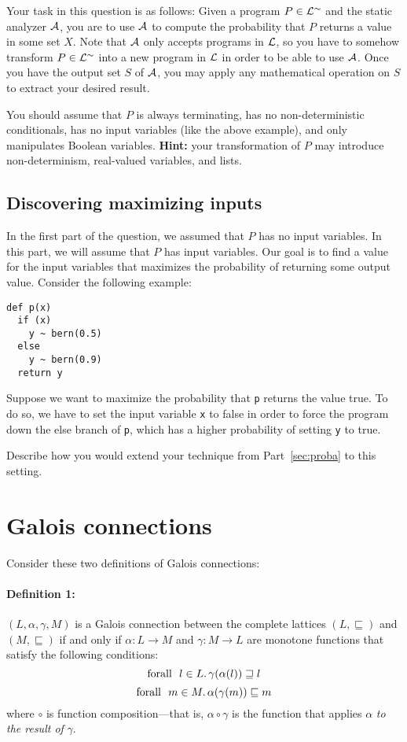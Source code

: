 \documentclass[11pt, oneside]{article}   	%
\begin{document}
Your task in this question is as follows:
Given a program $P \in \mathcal{L}^\sim$ and the static
analyzer $\mathcal{A}$, you are to use $\mathcal{A}$
to compute the probability that $P$ returns
a value in some set $X$.
Note that $\mathcal{A}$ only accepts programs in $\mathcal{L}$,
so you have to somehow transform $P \in \mathcal{L}^\sim$ into a new
program in $\mathcal{L}$
in order to be able to use $\mathcal{A}$.
Once you have the output set $S$ of $\mathcal{A}$,
you may apply any mathematical  operation on $S$ to
extract your desired result.

You should assume that $P$ is always terminating,
has no non-deterministic conditionals,
has no input variables (like the above example),
and only manipulates Boolean variables.
\textbf{Hint:} your transformation of $P$
may introduce non-determinism, real-valued variables,
and lists.

\subsection{Discovering maximizing inputs}
In the first part of the question,
we assumed that $P$ has no input variables.
In this part, we will assume that $P$ has input variables.
Our goal is to find a value for the input variables
that maximizes the probability of returning some output value.
Consider the following example:
\begin{verbatim}
def p(x)
  if (x)
    y ~ bern(0.5)
  else
    y ~ bern(0.9)
  return y
\end{verbatim}
Suppose we want to maximize the probability
that \texttt{p} returns the value true.
To do so, we have to set the input variable \texttt{x}
to false in order to force the program down the
else branch of \texttt{p}, which has a higher
probability of setting \texttt{y} to true.

Describe how you would extend your
technique from Part~\ref{sec:proba} to this setting.

\section{Galois connections}
Consider these two definitions of Galois connections:

\paragraph{Definition 1:}
$(L,\alpha,\gamma,M)$ is a Galois connection
between the complete lattices $(L,\sqsubseteq)$
and $(M,\sqsubseteq)$ if and only if
$\alpha:L \rightarrow M$ and $\gamma:M \rightarrow L$
are monotone functions that satisfy the following conditions:
$$\text{forall }~ l \in L \ldotp \gamma(\alpha(l)) \sqsupseteq l$$
$$\text{forall }~ m \in M \ldotp \alpha(\gamma(m)) \sqsubseteq m$$
where $\circ$ is function composition---that is,
$\alpha \circ \gamma$ is the function that applies
$\alpha$ \emph{to the result of} $\gamma$.
\end{document}
